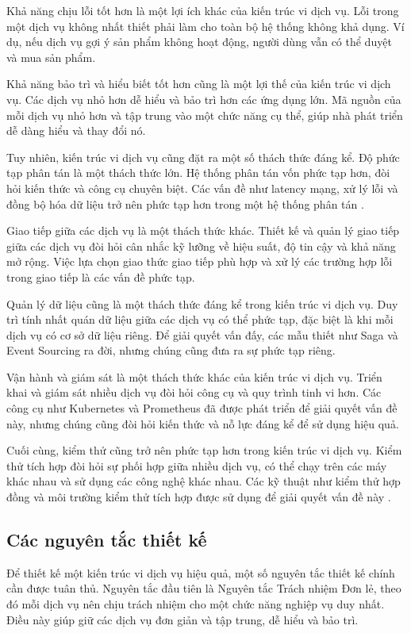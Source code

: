 Khả năng chịu lỗi tốt hơn là một lợi ích khác của kiến trúc vi dịch vụ. Lỗi
trong một dịch vụ không nhất thiết phải làm cho toàn bộ hệ thống không khả
dụng. Ví dụ, nếu dịch vụ gợi ý sản phẩm không hoạt động, người dùng vẫn có thể
duyệt và mua sản phẩm.

Khả năng bảo trì và hiểu biết tốt hơn cũng là một lợi thế của kiến trúc
vi dịch vụ. Các dịch vụ nhỏ hơn dễ hiểu và bảo trì hơn các ứng dụng lớn. Mã
nguồn của mỗi dịch vụ nhỏ hơn và tập trung vào một chức năng cụ thể, giúp nhà
phát triển dễ dàng hiểu và thay đổi nó.

Tuy nhiên, kiến trúc vi dịch vụ cũng đặt ra một số thách thức đáng kể. Độ
phức tạp phân tán là một thách thức lớn. Hệ thống phân tán vốn phức tạp hơn,
đòi hỏi kiến thức và công cụ chuyên biệt. Các vấn đề như latency mạng, xử lý
lỗi và đồng bộ hóa dữ liệu trở nên phức tạp hơn trong một hệ thống phân tán \cite{newman2015}.

Giao tiếp giữa các dịch vụ là một thách thức khác. Thiết kế và quản lý giao
tiếp giữa các dịch vụ đòi hỏi cân nhắc kỹ lưỡng về hiệu suất, độ tin cậy và khả
năng mở rộng. Việc lựa chọn giao thức giao tiếp phù hợp và xử lý các trường hợp
lỗi trong giao tiếp là các vấn đề phức tạp.

Quản lý dữ liệu cũng là một thách thức đáng kể trong kiến trúc vi dịch vụ.
Duy trì tính nhất quán dữ liệu giữa các dịch vụ có thể phức tạp, đặc biệt là
khi mỗi dịch vụ có cơ sở dữ liệu riêng. Để giải quyết vấn đấy, các mẫu thiết như Saga và Event Sourcing ra đời, nhưng chúng cũng đưa ra sự phức tạp riêng.

Vận hành và giám sát là một thách thức khác của kiến trúc vi dịch vụ. Triển
khai và giám sát nhiều dịch vụ đòi hỏi công cụ và quy trình tinh vi hơn. Các
công cụ như Kubernetes và Prometheus đã được phát triển để giải quyết vấn đề
này, nhưng chúng cũng đòi hỏi kiến thức và nỗ lực đáng kể để sử dụng hiệu quả.

Cuối cùng, kiểm thử cũng trở nên phức tạp hơn trong kiến trúc vi dịch vụ.
Kiểm thử tích hợp đòi hỏi sự phối hợp giữa nhiều dịch vụ, có thể chạy trên các
máy khác nhau và sử dụng các công nghệ khác nhau. Các kỹ thuật như kiểm thử hợp
đồng và môi trường kiểm thử tích hợp được sử dụng để giải quyết vấn đề này \cite{newman2015}.

\subsection{Các nguyên tắc thiết kế}
Để thiết kế một kiến trúc vi dịch vụ hiệu quả, một số nguyên tắc thiết kế chính cần được tuân thủ. Nguyên tắc đầu tiên là Nguyên tắc Trách nhiệm Đơn lẻ, theo đó mỗi dịch vụ nên chịu trách nhiệm cho một chức năng nghiệp vụ duy nhất. Điều này giúp giữ các dịch vụ đơn giản và tập trung, dễ hiểu và bảo trì.

